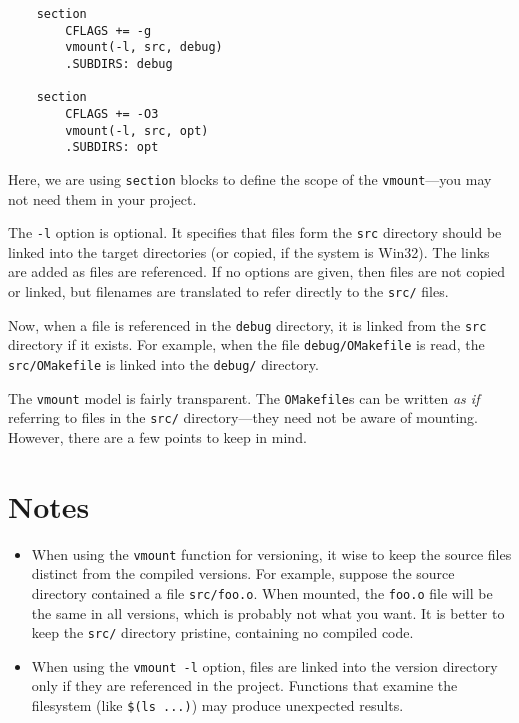 \begin{verbatim}
    section
        CFLAGS += -g
        vmount(-l, src, debug)
        .SUBDIRS: debug

    section
        CFLAGS += -O3
        vmount(-l, src, opt)
        .SUBDIRS: opt
\end{verbatim}

Here, we are using \verb+section+ blocks to define the scope of the \verb+vmount+---you may not need
them in your project.

The \verb+-l+ option is optional.  It specifies that files form the \verb+src+ directory should be
linked into the target directories (or copied, if the system is Win32).  The links are added as
files are referenced.  If no options are given, then files are not copied or linked, but filenames
are translated to refer directly to the \verb+src/+ files.

Now, when a file is referenced in the \verb+debug+ directory, it is linked from the \verb+src+
directory if it exists.  For example, when the file \verb+debug/OMakefile+ is read, the
\verb+src/OMakefile+ is linked into the \verb+debug/+ directory.

The \verb+vmount+ model is fairly transparent.  The \verb+OMakefile+s can be written \emph{as if}
referring to files in the \verb+src/+ directory---they need not be aware of mounting.
However, there are a few points to keep in mind.

\section{Notes}

\begin{itemize}
\item When using the \verb+vmount+ function for versioning, it wise to keep the source files
distinct from the compiled versions.  For example, suppose the source directory contained a file
\verb+src/foo.o+.  When mounted, the \verb+foo.o+ file will be the same in all versions, which is
probably not what you want.  It is better to keep the \verb+src/+ directory pristine, containing no
compiled code.

\item When using the \verb+vmount -l+ option, files are linked into the version directory only if
they are referenced in the project.  Functions that examine the filesystem (like \verb+$(ls ...)+)
may produce unexpected results.
\end{itemize}

